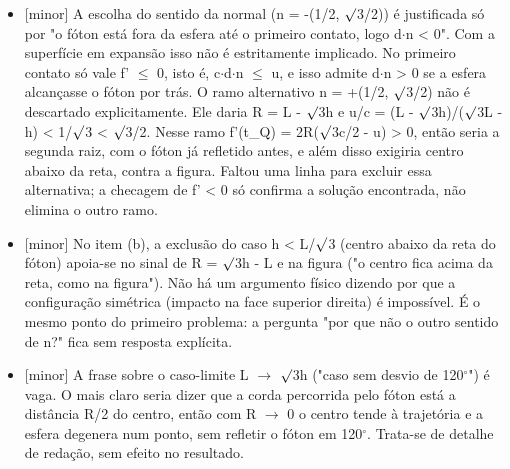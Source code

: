 \documentclass{article}%
\begin{document}
\begin{itemize}%
\item%
{[}minor{]} A escolha do sentido da normal (n = -(1/2, $\surd$3/2)) é justificada só por "o fóton está fora da esfera até o primeiro contato, logo d$\cdot$n < 0". Com a superfície em expansão isso não é estritamente implicado. No primeiro contato só vale f' $\leq$ 0, isto é, c$\cdot$d$\cdot$n $\leq$ u, e isso admite d$\cdot$n > 0 se a esfera alcançasse o fóton por trás. O ramo alternativo n = +(1/2, $\surd$3/2) não é descartado explicitamente. Ele daria R = L - $\surd$3h e u/c = (L - $\surd$3h)/($\surd$3L - h) < 1/$\surd$3 < $\surd$3/2. Nesse ramo f'(t\_Q) = 2R($\surd$3c/2 - u) > 0, então seria a segunda raiz, com o fóton já refletido antes, e além disso exigiria centro abaixo da reta, contra a figura. Faltou uma linha para excluir essa alternativa; a checagem de f' < 0 só confirma a solução encontrada, não elimina o outro ramo.%
\item%
{[}minor{]} No item (b), a exclusão do caso h < L/$\surd$3 (centro abaixo da reta do fóton) apoia{-}se no sinal de R = $\surd$3h - L e na figura ("o centro fica acima da reta, como na figura"). Não há um argumento físico dizendo por que a configuração simétrica (impacto na face superior direita) é impossível. É o mesmo ponto do primeiro problema: a pergunta "por que não o outro sentido de n?" fica sem resposta explícita.%
\item%
{[}minor{]} A frase sobre o caso{-}limite L $\to$ $\surd$3h ("caso sem desvio de 120$^\circ$") é vaga. O mais claro seria dizer que a corda percorrida pelo fóton está a distância R/2 do centro, então com R $\to$ 0 o centro tende à trajetória e a esfera degenera num ponto, sem refletir o fóton em 120$^\circ$. Trata{-}se de detalhe de redação, sem efeito no resultado.%
\end{itemize}%
\end{document}

